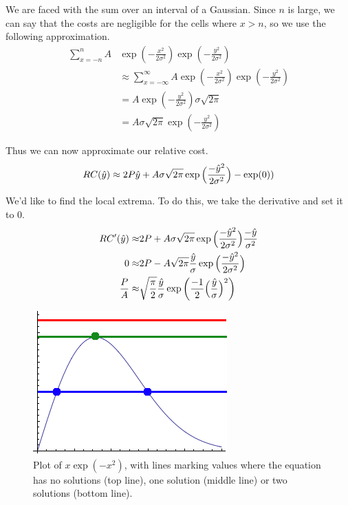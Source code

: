 We are faced with the sum over an interval of a Gaussian. Since $n$ is large, we can say that the costs are negligible for the cells where $x>n$, so we use the following approximation. 
\begin{align*}
        \sum\limits_{x=-n}^{n} A&\exp\left(-\frac{x^2}{2\sigma^2}\right)\exp\left(-\frac{y^2}{2\sigma^2}\right) \\
&\approx \sum\limits_{x=-\infty}^{\infty} A\exp\left(-\frac{x^2}{2\sigma^2}\right)\exp\left(-\frac{y^2}{2\sigma^2}\right)  \\
&= A\exp\left(-\frac{y^2}{2\sigma^2}\right)\sigma\sqrt{2\pi} \\
&= A\sigma\sqrt{2\pi}\exp\left(-\frac{y^2}{2\sigma^2}\right)
\end{align*}

Thus we can now approximate our relative cost. 
\[
RC(\hat{y}) \approx 2P\hat{y} + A\sigma\sqrt{2\pi} \exp\Big(\frac{-\hat{y}^2}{2\sigma^2}\Big) - \exp(0) ) \\
\]

We'd like to find the local extrema. To do this, we take the derivative and set it to 0. 
\begin{align}
RC'(\hat{y}) \approx& 2P + A\sigma\sqrt{2\pi}             \exp\Big( \frac{-\hat{y}^2}{2\sigma^2} \Big) \frac{-\hat{y}}{\sigma^2}\notag\\
0  \approx& 2P - A\sqrt{2\pi}        \frac{\hat{y}}{\sigma} \exp\Big( \frac{-\hat{y}^2}{2\sigma^2} \Big) \notag\\
  \frac{P}{A} \approx& \sqrt{\frac{\pi}{2}} \frac{\hat{y}}{\sigma} \exp\bigg( \frac{-1}{2} \Big(\frac{\hat{y}}{\sigma} \Big)^2 \bigg) 
\end{align}
\begin{figure}
\centering
\includegraphics[width=0.4\columnwidth]{graphix/lambert.png}
\caption{Plot of $x \exp(-x^2)$, with lines marking values where the equation has no solutions (top line), one solution (middle line) or two solutions (bottom line).}
\label{fig:lambert}
\end{figure}


